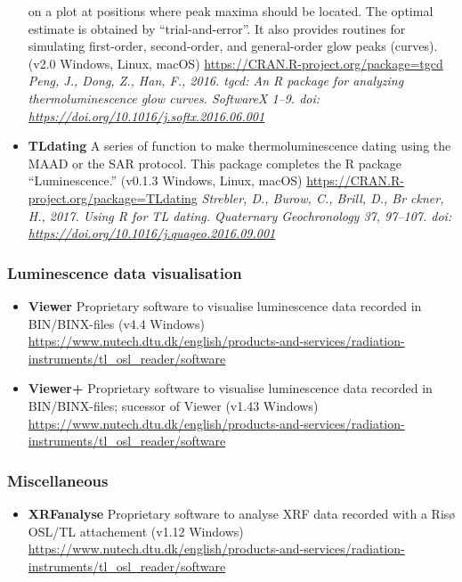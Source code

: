 \documentclass[]{article}
\providecommand{\tightlist}{%
  \setlength{\itemsep}{0pt}\setlength{\parskip}{0pt}}
\begin{document}
\begin{itemize}
  on a plot at positions where peak maxima should be located. The optimal estimate
  is obtained by ``trial-and-error''. It also provides routines for simulating
  first-order, second-order, and general-order glow peaks (curves).
  (v2.0 \textbar{} Windows, Linux, macOS)
  \url{https://CRAN.R-project.org/package=tgcd}
  \emph{Peng, J., Dong, Z., Han, F., 2016. tgcd: An R package for analyzing thermoluminescence glow curves. SoftwareX 1--9. doi: \url{https://doi.org/10.1016/j.softx.2016.06.001}}
\item
  \textbf{TLdating}
  A series of function to make thermoluminescence dating using the MAAD or the SAR protocol.
  This package completes the R package ``Luminescence.''
  (v0.1.3 \textbar{} Windows, Linux, macOS)
  \url{https://CRAN.R-project.org/package=TLdating}
  \emph{Strebler, D., Burow, C., Brill, D., Br ckner, H., 2017. Using R for TL dating. Quaternary Geochronology 37, 97--107. doi: \url{https://doi.org/10.1016/j.quageo.2016.09.001}}
\end{itemize}

\hypertarget{luminescence-data-visualisation}{%
\subsubsection{Luminescence data visualisation}\label{luminescence-data-visualisation}}

\begin{itemize}
\tightlist
\item
  \textbf{Viewer}
  Proprietary software to visualise luminescence data recorded in BIN/BINX-files
  (v4.4 \textbar{} Windows)
  \url{https://www.nutech.dtu.dk/english/products-and-services/radiation-instruments/tl_osl_reader/software}
  \emph{ }
\item
  \textbf{Viewer+}
  Proprietary software to visualise luminescence data recorded in BIN/BINX-files; sucessor of Viewer
  (v1.43 \textbar{} Windows)
  \url{https://www.nutech.dtu.dk/english/products-and-services/radiation-instruments/tl_osl_reader/software}
  \emph{ }
\end{itemize}

\hypertarget{miscellaneous}{%
\subsubsection{Miscellaneous}\label{miscellaneous}}

\begin{itemize}
\tightlist
\item
  \textbf{XRFanalyse}
  Proprietary software to analyse XRF data recorded with a Risø OSL/TL attachement
  (v1.12 \textbar{} Windows)
  \url{https://www.nutech.dtu.dk/english/products-and-services/radiation-instruments/tl_osl_reader/software}
  \emph{ }
\end{itemize}
\end{document}
